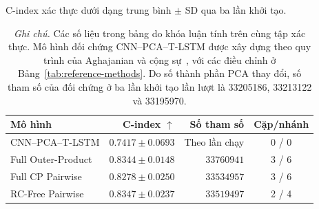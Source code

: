 \begin{table}[H]
\centering\small
\caption[So sánh C-index và độ phức tạp mô hình]{C-index xác thực dưới dạng trung bình $\pm$ SD qua ba lần khởi tạo.}
\label{tab:standard-bench}
\begin{tabularx}{\linewidth}{@{}Y r r c@{}}
\toprule
\textbf{Mô hình} & \textbf{C-index $\uparrow$} & \textbf{Số tham số} & \textbf{Cặp/nhánh} \\
\midrule
CNN--PCA--T-LSTM & $0.7417\pm0.0693$ & Theo lần chạy & 0 / 0 \\
Full Outer-Product & $0.8344\pm0.0148$ & $33760941$ & 3 / 6 \\
Full CP Pairwise & $0.8278\pm0.0250$ & $33534957$ & 3 / 6 \\
RC-Free Pairwise & $\mathbf{0.8347\pm0.0237}$ & $33519497$ & 2 / 4 \\
\bottomrule
\end{tabularx}
\caption*{\textit{Ghi chú.} Các số liệu trong bảng do khóa luận tính trên cùng tập xác thực. Mô hình đối chứng CNN--PCA--T-LSTM được xây dựng theo quy trình của Aghajanian và cộng sự~\cite{aghajanian2025longitudinal}, với các điều chỉnh ở Bảng~\ref{tab:reference-methods}. Do số thành phần PCA thay đổi, số tham số của đối chứng ở ba lần khởi tạo lần lượt là 33205186, 33213122 và 33195970.}
\end{table}
